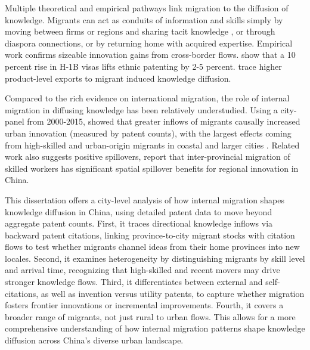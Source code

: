 \documentclass[12pt]{article}
\begin{document}
Multiple theoretical and empirical pathways link migration to the diffusion of knowledge. Migrants can act as conduits of information and skills simply by moving between firms or regions and sharing tacit knowledge \citep{cominExplorationTechnologyDiffusion2010,moserGermanJewishEmigres2014,pratoGlobalRaceTalent2025}, or through diaspora connections\citep{kerrEthnicScientificCommunities2008,baharMigrationKnowledgeDiffusion2018,miguelezInventorMigrationKnowledge2020}, or by returning home with acquired expertise\citep{saxenianNewArgonautsRegional2006,baharMigrationKnowledgeDiffusion2024,colucciaReturnInnovationKnowledge2025}. Empirical work confirms sizeable innovation gains from cross-border flows. \cite{kerrSupplySideInnovation2010} show that a 10 percent rise in H-1B visas lifts ethnic patenting by 2-5 percent. \cite{baharMigrationKnowledgeDiffusion2018} trace higher product-level exports to migrant induced knowledge diffusion. 

Compared to the rich evidence on international migration, the role of internal migration in diffusing knowledge has been relatively understudied. Using a city-panel from 2000-2015, \cite{guanHowDoesLargescale2025} showed that greater inflows of migrants causally increased urban innovation (measured by patent counts), with the largest effects coming from high-skilled and urban-origin migrants in coastal and larger cities . Related work also suggests positive spillovers, \cite{gaoSpatialSpilloverEffects2024} report that inter-provincial migration of skilled workers has significant spatial spillover benefits for regional innovation in China.

This dissertation offers a city-level analysis of how internal migration shapes knowledge diffusion in China, using detailed patent data to move beyond aggregate patent counts. First, it traces directional knowledge inflows via backward patent citations, linking province-to-city migrant stocks with citation flows to test whether migrants channel ideas from their home provinces into new locales. Second, it examines heterogeneity by distinguishing migrants by skill level and arrival time, recognizing that high-skilled and recent movers may drive stronger knowledge flows. Third, it differentiates between external and self-citations, as well as invention versus utility patents, to capture whether migration fosters frontier innovations or incremental improvements. Fourth, it covers a broader range of migrants, not just rural to urban flows. This allows for a more comprehensive understanding of how internal migration patterns shape knowledge diffusion across China's diverse urban landscape.
\end{document}
